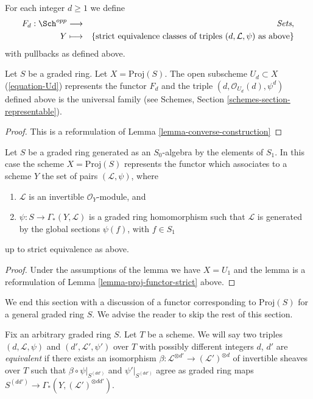 \medskip\noindent
For each integer $d \geq 1$ we define
\begin{eqnarray*}
F_d : \Sch^{opp} & \longrightarrow & \textit{Sets}, \\
Y & \longmapsto &
\{\text{strict equivalence classes of triples }
(d, \mathcal{L}, \psi)
\text{ as above}\}
\end{eqnarray*}
with pullbacks as defined above.

\begin{lemma}
\label{lemma-proj-functor-strict}
Let $S$ be a graded ring.
Let $X = \text{Proj}(S)$.
The open subscheme $U_d \subset X$ (\ref{equation-Ud}) represents the
functor $F_d$ and the triple $(d, \mathcal{O}_{U_d}(d), \psi^d)$
defined above is the universal family (see
Schemes, Section \ref{schemes-section-representable}).
\end{lemma}

\begin{proof}
This is a reformulation of Lemma \ref{lemma-converse-construction}
\end{proof}

\begin{lemma}
\label{lemma-apply}
Let $S$ be a graded ring generated as an $S_0$-algebra by
the elements of $S_1$. In this case the scheme $X = \text{Proj}(S)$
represents the functor which associates to a scheme
$Y$ the set of pairs $(\mathcal{L}, \psi)$, where
\begin{enumerate}
\item $\mathcal{L}$ is an invertible $\mathcal{O}_Y$-module, and
\item $\psi : S \to \Gamma_*(Y, \mathcal{L})$ is a graded
ring homomorphism such that $\mathcal{L}$ is generated by
the global sections $\psi(f)$, with $f \in S_1$
\end{enumerate}
up to strict equivalence as above.
\end{lemma}

\begin{proof}
Under the assumptions of the lemma we have $X = U_1$ and the
lemma is a reformulation of Lemma \ref{lemma-proj-functor-strict} above.
\end{proof}

\noindent
We end this section with a discussion of a functor corresponding
to $\text{Proj}(S)$ for a general graded ring $S$.
We advise the reader to skip the rest of this section.

\medskip\noindent
Fix an arbitrary graded ring $S$. Let $T$ be a scheme.
We will say two triples $(d, \mathcal{L}, \psi)$ and
$(d', \mathcal{L}', \psi')$ over $T$ with possibly different integers
$d$, $d'$ are {\it equivalent} if there exists
an isomorphism
$\beta : \mathcal{L}^{\otimes d'} \to (\mathcal{L}')^{\otimes d}$
of invertible sheaves over $T$
such that $\beta \circ \psi|_{S^{(dd')}}$ and $\psi'|_{S^{(dd')}}$ agree
as graded ring maps $S^{(dd')} \to \Gamma_*(Y, (\mathcal{L}')^{\otimes dd'})$.

